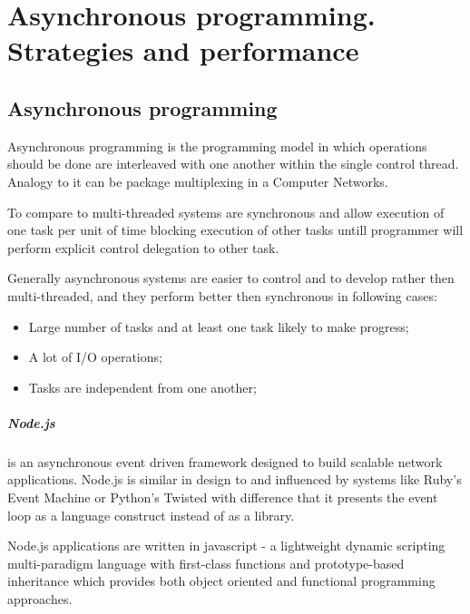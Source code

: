  \chapter{Asynchronous programming. Strategies and performance}
\section{Asynchronous programming}
Asynchronous programming is the programming model in which operations should be done are interleaved with one another within the single control thread. Analogy to it can be package multiplexing in a Computer Networks. 

To compare to multi-threaded systems are synchronous and allow execution of one task per unit of time blocking execution of other tasks untill programmer will perform explicit control delegation to other task.

Generally asynchronous systems are easier to control and to develop rather then multi-threaded, and  they perform better then synchronous in following cases\cite{asyncArticle}:
 \begin{itemize}
	\item Large number of tasks and at least one task likely to make progress;
	\item A lot of I/O operations;
	\item Tasks are independent from one another;
 \end{itemize}

\paragraph{Node.js} is an asynchronous event driven framework designed to build scalable network applications.
Node.js is similar in design to and influenced by systems like Ruby's Event Machine or Python's Twisted with difference that it presents the event loop as a language construct instead of as a library\cite{nodejsabout}.

Node.js applications are written in javascript - a lightweight dynamic scripting multi-paradigm language with first-class functions and prototype-based inheritance which provides both object oriented and functional programming approaches.
 
